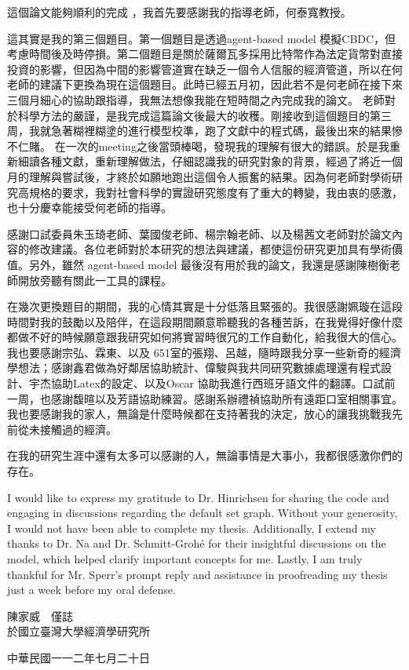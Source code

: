\begin{acknowledgementszh}

這個論文能夠順利的完成 ，我首先要感謝我的指導老師，何泰寬教授。

這其實是我的第三個題目。第一個題目是透過agent-based model 模擬CBDC，但考慮時間後及時停損。第二個題目是關於薩爾瓦多採用比特幣作為法定貨幣對直接投資的影響，但因為中間的影響管道實在缺乏一個令人信服的經濟管道，所以在何老師的建議下更換為現在這個題目。此時已經五月初，因此若不是何老師在接下來三個月細心的協助跟指導，我無法想像我能在短時間之內完成我的論文。
老師對於科學方法的嚴謹，是我完成這篇論文後最大的收穫。剛接收到這個題目的第三周，我就急著糊裡糊塗的進行模型校準，跑了文獻中的程式碼，最後出來的結果慘不仁賭。
在一次的meeting之後當頭棒喝，發現我的理解有很大的錯誤。於是我重新細讀各種文獻，重新理解做法，仔細認識我的研究對象的背景，經過了將近一個月的理解與嘗試後，才終於如願地跑出這個令人振奮的結果。因為何老師對學術研究高規格的要求，我對社會科學的實證研究態度有了重大的轉變，我由衷的感激，也十分慶幸能接受何老師的指導。

感謝口試委員朱玉琦老師、葉國俊老師、楊宗翰老師、以及楊茜文老師對於論文內容的修改建議。各位老師對於本研究的想法與建議，都使這份研究更加具有學術價值。另外，雖然 agent-based model 最後沒有用於我的論文，我還是感謝陳樹衡老師開放旁聽有關此一工具的課程。

在幾次更換題目的期間，我的心情其實是十分低落且緊張的。我很感謝姵璇在這段時間對我的鼓勵以及陪伴，在這段期間願意聆聽我的各種苦訴，在我覺得好像什麼都做不好的時候願意跟我研究如何將實習時很冗的工作自動化，給我很大的信心。我也要感謝宗弘、霖東、以及 651室的張翔、呂越，隨時跟我分享一些新奇的經濟學想法；感謝鑫君做為好鄰居協助統計、偉駿與我共同研究數據處理還有程式設計、宇杰協助Latex的設定、以及Oscar 協助我進行西班牙語文件的翻譯。口試前一周，也感謝馥暄以及芳語協助練習。感謝系辦禮禎協助所有遠距口室相關事宜。我也要感謝我的家人，無論是什麼時候都在支持著我的決定，放心的讓我挑戰我先前從未接觸過的經濟。

在我的研究生涯中還有太多可以感謝的人，無論事情是大事小，我都很感激你們的存在。

I would like to express my gratitude to Dr. Hinrichsen for sharing the code and engaging in discussions regarding the default set graph. Without your generosity, I would not have been able to complete my thesis. Additionally, I extend my thanks to Dr. Na and Dr. Schmitt-Grohé for their insightful discussions on the model, which helped clarify important concepts for me. Lastly, I am truly thankful for Mr. Sperr's prompt reply and assistance in proofreading my thesis just a week before my oral defense.
\\[2em]
\begin{flushright}
    陳家威　僅誌\\
    於國立臺灣大學經濟學研究所

    中華民國一一二年七月二十日
\end{flushright}

\end{acknowledgementszh}

